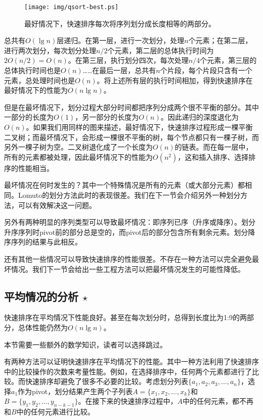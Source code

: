 \documentclass[UTF8]{article}
\begin{document}
\begin{figure}[htbp]
 \centering
 \texttt{[image: img/qsort-best.ps]}
 \caption{最好情况下，快速排序每次将序列划分成长度相等的两部分。}
 \label{fig:qsort-best}
\end{figure}

总共有$O(\lg n)$层递归。在第一层，进行一次划分，处理$n$个元素；在第二层，进行两次划分，每次划分处理$n/2$个元素，第二层的总体执行时间为$2 O(n/2) = O(n)$。在第三层，执行划分四次，每次处理$n/4$个元素，第三层的总体执行时间也是$O(n)$……在最后一层，总共有$n$个片段，每个片段只含有一个元素，总处理时间也是$O(n)$。将上述所有层的执行时间相加，得到快速排序在最好情况下的性能为$O(n \lg n)$。

但是在最坏情况下，划分过程大部分时间都把序列分成两个很不平衡的部分。其中一部分的长度为$O(1)$，另一部分的长度为$O(n)$。因此递归的深度退化为$O(n)$。如果我们用同样的图来描述，最好情况下，快速排序过程形成一棵平衡二叉树；而最坏情况下，会形成一棵很不平衡的树，每个节点都只有一棵子树，而另外一棵子树为空。二叉树退化成了一个长度为$O(n)$的链表。而在每一层中，所有的元素都被处理，因此最坏情况下的性能为$O(n^2)$，这和插入排序、选择排序的性能相当。

最坏情况在何时发生的？其中一个特殊情况是所有的元素（或大部分元素）都相同。Lomuto的划分方法此时的表现很差。我们在下一节会介绍另外一种划分方法，可以有效解决这一问题。

另外有两种明显的序列类型可以导致最坏情况：即序列已序（升序或降序）。划分升序序列时pivot前的部分总是空的，而pivot后的部分包含所有剩余元素。划分降序序列的结果与此相反。

还有其他一些情况可以导致快速排序的性能很差。不存在一种方法可以完全避免最坏情况。我们下一节会给出一些工程方法可以把最坏情况发生的可能性降低。

\subsection{平均情况的分析 $\star$}

快速排序在平均情况下性能良好。甚至在每次划分时，总得到长度比为1:9的两部分，总体性能仍然为$O(n \lg n)$\cite{CLRS}。

本节需要一些额外的数学知识，读者可以选择跳过。

有两种方法可以证明快速排序在平均情况下的性能。其中一种方法利用了快速排序中的比较操作的次数来考量性能\cite{CLRS}。例如，在选择排序中，任何两个元素都进行了比较。而快速排序却避免了很多不必要的比较。考虑划分列表$\{ a_1, a_2, a_3, ..., a_n\}$，选择$a_1$作为pivot，划分结果产生两个子列表$A = \{x_1, x_2, ..., x_k\}$和$B = \{ y_1, y_2, ..., y_{n-k-1} \}$。在接下来的快速排序过程中，$A$中的任何元素，都不再和$B$中的任何元素进行比较。
\end{document}

